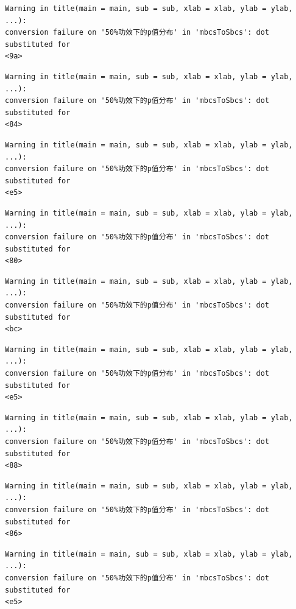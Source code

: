 \documentclass[
  letterpaper,
  DIV=11,
  numbers=noendperiod]{scrreprt}
\begin{document}
\begin{verbatim}
Warning in title(main = main, sub = sub, xlab = xlab, ylab = ylab, ...):
conversion failure on '50%功效下的p值分布' in 'mbcsToSbcs': dot substituted for
<9a>
\end{verbatim}

\begin{verbatim}
Warning in title(main = main, sub = sub, xlab = xlab, ylab = ylab, ...):
conversion failure on '50%功效下的p值分布' in 'mbcsToSbcs': dot substituted for
<84>
\end{verbatim}

\begin{verbatim}
Warning in title(main = main, sub = sub, xlab = xlab, ylab = ylab, ...):
conversion failure on '50%功效下的p值分布' in 'mbcsToSbcs': dot substituted for
<e5>
\end{verbatim}

\begin{verbatim}
Warning in title(main = main, sub = sub, xlab = xlab, ylab = ylab, ...):
conversion failure on '50%功效下的p值分布' in 'mbcsToSbcs': dot substituted for
<80>
\end{verbatim}

\begin{verbatim}
Warning in title(main = main, sub = sub, xlab = xlab, ylab = ylab, ...):
conversion failure on '50%功效下的p值分布' in 'mbcsToSbcs': dot substituted for
<bc>
\end{verbatim}

\begin{verbatim}
Warning in title(main = main, sub = sub, xlab = xlab, ylab = ylab, ...):
conversion failure on '50%功效下的p值分布' in 'mbcsToSbcs': dot substituted for
<e5>
\end{verbatim}

\begin{verbatim}
Warning in title(main = main, sub = sub, xlab = xlab, ylab = ylab, ...):
conversion failure on '50%功效下的p值分布' in 'mbcsToSbcs': dot substituted for
<88>
\end{verbatim}

\begin{verbatim}
Warning in title(main = main, sub = sub, xlab = xlab, ylab = ylab, ...):
conversion failure on '50%功效下的p值分布' in 'mbcsToSbcs': dot substituted for
<86>
\end{verbatim}

\begin{verbatim}
Warning in title(main = main, sub = sub, xlab = xlab, ylab = ylab, ...):
conversion failure on '50%功效下的p值分布' in 'mbcsToSbcs': dot substituted for
<e5>
\end{verbatim}
\end{document}
